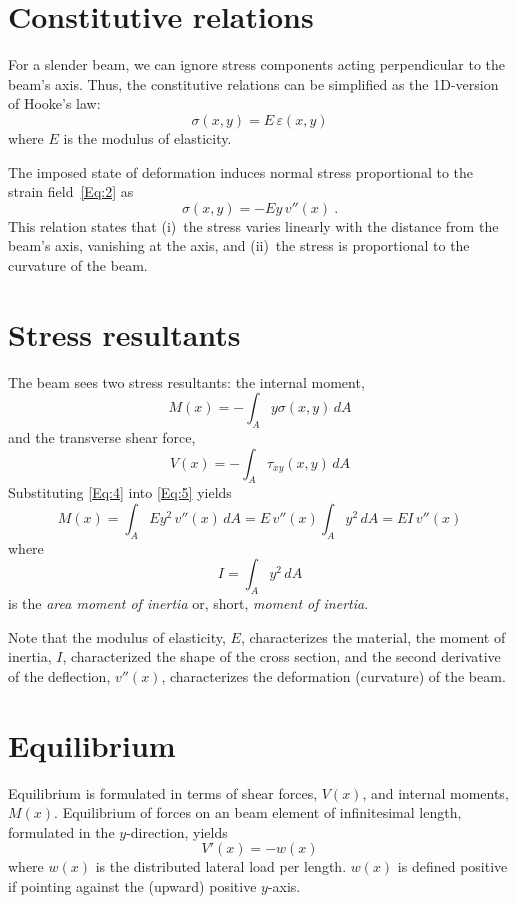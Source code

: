 \documentclass[11pt, oneside]{article}   	%
\begin{document}
\section{Constitutive relations}
For a slender beam, we can ignore stress components acting perpendicular to the beam's axis.  Thus, the constitutive relations can be simplified as the 1D-version of Hooke's law:
\begin{equation}
	\sigma(x,y) = E\,\varepsilon(x,y)
	\label{Eq:3}
\end{equation}
where $E$ is the modulus of elasticity.

The imposed state of deformation induces normal stress proportional to the strain field~\eqref{Eq:2} as
\begin{equation}
	\sigma(x,y) = -E y\,v''(x) ~.
	\label{Eq:4}
\end{equation}
This relation states that (i)~the stress varies linearly with the distance from the beam's axis, vanishing at the axis, and (ii)~the stress is proportional to the curvature of the beam.

\section{Stress resultants}
The beam sees two stress resultants: the internal moment, 
\begin{equation}
	M(x) = -\int_A y\sigma(x,y)\, dA
	\label{Eq:5}
\end{equation}
and the transverse shear force,
\begin{equation}
	V(x)  = -\int_A \tau_{xy}(x,y)\, dA
	\label{Eq:6}
\end{equation}
Substituting \eqref{Eq:4} into \eqref{Eq:5} yields
\begin{equation}
	M(x) = \int_A E y^2 \, v''(x) \, dA = E\,v''(x) \int_A y^2\,dA = EI\,v''(x)
	\label{Eq:7}
\end{equation}
where 
\begin{equation}
	I = \int_A y^2\,dA
	\label{Eq:7b}
\end{equation}
is the \emph{area moment of inertia} or, short, \emph{moment of inertia}.

Note that the modulus of elasticity, $E$, characterizes the material, the moment of inertia, $I$, characterized the shape of the cross section, and the second derivative of the deflection, $v''(x)$, characterizes the deformation (curvature) of the beam.

\section{Equilibrium}
Equilibrium is formulated in terms of shear forces, $V(x)$, and internal moments, $M(x)$.
Equilibrium of forces on an beam element of infinitesimal length, formulated in the $y$-direction, yields
\begin{equation}
	V'(x) = -w(x)
	\label{Eq:8}
\end{equation}
where $w(x)$ is the distributed lateral load per length.  $w(x)$ is defined positive if pointing against the (upward) positive $y$-axis.
\end{document}
